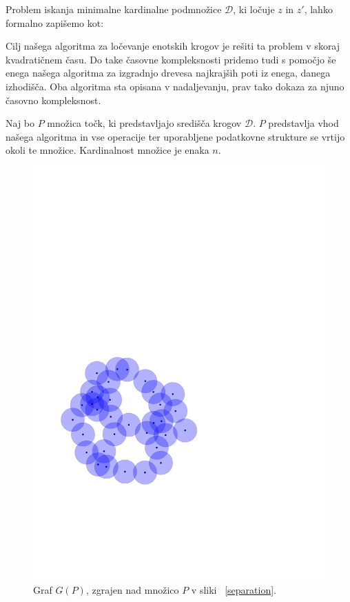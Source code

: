 \documentclass[a4paper, 12pt]{book}
\newcommand{\D}{\ensuremath{\mathcal{D}}}
\begin{document}
Problem iskanja minimalne kardinalne podmnožice $\D$, ki ločuje $z$ in $z'$, lahko formalno zapišemo kot:





Cilj našega algoritma za ločevanje enotskih krogov je rešiti ta problem v skoraj kvadratičnem času. Do take časovne kompleksnosti pridemo tudi s pomočjo še enega našega algoritma za izgradnjo drevesa najkrajših poti iz enega, danega izhodišča. Oba algoritma sta opisana v nadaljevanju, prav tako dokaza za njuno časovno kompleksnost.

Naj bo $P$ množica točk, ki predstavljajo središča krogov $\D$. $P$ predstavlja vhod našega algoritma in vse operacije ter uporabljene podatkovne strukture se vrtijo okoli te množice. Kardinalnost množice je enaka $n$.

\begin{figure}
\centerline{\includegraphics[scale=0.6,page=5]{pics/unitdisks.pdf}}
\caption{Graf $G(P)$, zgrajen nad množico $P$ v sliki ~\ref{separation}.}
\label{gdisks}
\end{figure}
\end{document}
